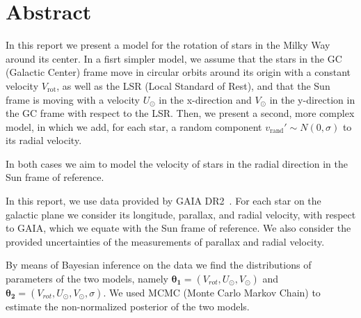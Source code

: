 \section*{Abstract}

In this report we present a model for the rotation of stars in the Milky Way around its center.
In a fisrt simpler model, we assume that the stars in the GC (Galactic Center) frame move in circular orbits around its origin with a constant velocity $V_{\text{rot}}$, as well as the LSR (Local Standard of Rest), and that the Sun frame is moving with a velocity $U_{\odot}$ in the x-direction and $V_{\odot}$ in the y-direction in the GC frame with respect to the LSR. Then, we present a second, more complex model, in which we add, for each star, a random component $v_{\text{rand}}' \sim N(0, \sigma)$ to its radial velocity.


In both cases we aim to model the velocity of stars in the radial direction 
in the Sun frame of reference.

In this report, we use data provided by GAIA DR2~\cite{GAIADR2}.
For each star on the galactic plane we consider its longitude, parallax, and radial velocity,
with respect to GAIA, which we equate with the Sun frame of reference.
We also consider the provided uncertainties of the measurements of parallax and radial velocity.

By means of Bayesian inference on the data we find the distributions 
of parameters of the two models, 
namely $\mathbf{\theta_1} = (V_{rot}, U_{\odot}, V_{\odot})$ 
and $\mathbf{\theta_2} = (V_{rot}, U_{\odot}, V_{\odot}, \sigma)$.
We used MCMC (Monte Carlo Markov Chain) 
to estimate the non-normalized posterior of the two models. 

